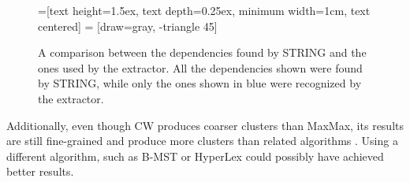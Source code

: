 \begin{figure}[ht]
\caption[Dependencies found by \acs*{STRING} and the extractor]{A comparison between
the dependencies found by STRING and the ones used by the extractor. All the
dependencies shown were found by \ac{STRING}, while only the ones shown in blue
were recognized by the extractor.}
\label{fig:extractor}
\centering
{}=[text height=1.5ex, text depth=0.25ex,
                        minimum width=1cm, text centered]
 = [draw=gray, -triangle 45]
\end{figure}

Additionally, even though \ac{CW} produces coarser clusters than MaxMax, its
results are still fine-grained and produce more clusters than related algorithms
\cite{marco2013clustering}. Using a different algorithm, such as \ac{B-MST}
\cite{marco2013clustering} or HyperLex \cite{veronis2004hyperlex} could possibly
have achieved better results.

